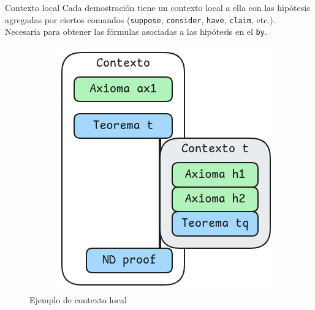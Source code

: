 \documentclass[xcolor={dvipsnames},spanish]{beamer}
\begin{document}
\begin{frame}{Contexto local}
    Cada demostración tiene un contexto local a ella con las hipótesis agregadas por ciertos comandos (\lstinline{suppose}, \lstinline{consider}, \lstinline{have}, \lstinline{claim}, etc.). Necesaria para obtener las fórmulas asociadas a las hipótesis en el \lstinline{by}.

    \begin{figure}[h]
        \centering
        \begin{columns}
            \begin{column}{0.5\textwidth}
                \begin{tabular}{c}
                    
                \end{tabular}
            \end{column}
            \begin{column}{0.35\textwidth}
                \includegraphics[scale=0.33]{img/ppa-local-context.png}
            \end{column}
        \end{columns}
        \caption{Ejemplo de contexto local}
    \end{figure}
\end{frame}
\end{document}
